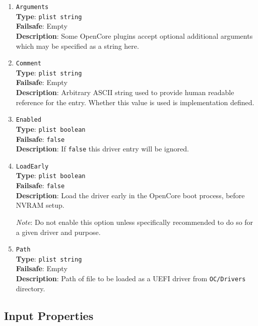 \documentclass[]{article}
\begin{document}
\begin{enumerate}

\item
  \texttt{Arguments}\\
  \textbf{Type}: \texttt{plist\ string}\\
  \textbf{Failsafe}: Empty\\
  \textbf{Description}: Some OpenCore plugins accept optional additional arguments
  which may be specified as a string here.

\item
  \texttt{Comment}\\
  \textbf{Type}: \texttt{plist\ string}\\
  \textbf{Failsafe}: Empty\\
  \textbf{Description}: Arbitrary ASCII string used to provide human readable
  reference for the entry. Whether this value is used is implementation defined.

\item
  \texttt{Enabled}\\
  \textbf{Type}: \texttt{plist\ boolean}\\
  \textbf{Failsafe}: \texttt{false}\\
  \textbf{Description}: If \texttt{false} this driver entry will be ignored.

\item
  \texttt{LoadEarly}\\
  \textbf{Type}: \texttt{plist\ boolean}\\
  \textbf{Failsafe}: \texttt{false}\\
  \textbf{Description}: Load the driver early in the OpenCore boot process, before NVRAM setup.

  \emph{Note}: Do not enable this option unless specifically recommended to do so for a
  given driver and purpose.

\item
  \texttt{Path}\\
  \textbf{Type}: \texttt{plist\ string}\\
  \textbf{Failsafe}: Empty\\
  \textbf{Description}: Path of file to be loaded as a UEFI driver
  from \texttt{OC/Drivers} directory.

\end{enumerate}


\subsection{Input Properties}\label{uefiinputprops}
\end{document}
